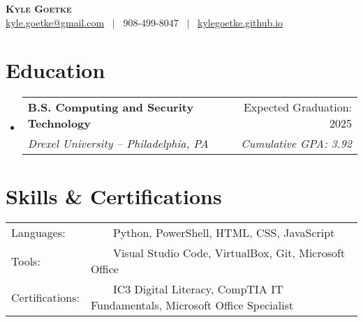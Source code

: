\documentclass[letterpaper,11pt]{article}
\makeatletter
\newcommand{\resumeSubheading}[4]{
	\vspace{-2pt}\item
		\begin{tabular*}{1\textwidth}[t]{l@{\extracolsep{\fill}}r}
			\textbf{#1} & #2 \\
			\textit{#3} & \textit{#4} \\
		\end{tabular*}\vspace{-7pt}
}
\newcommand{\resumeSubHeadingListStart}{\begin{itemize}[leftmargin=0in, label={}]}
\newcommand{\resumeSubHeadingListEnd}{\end{itemize}}
\makeatother
\begin{document}

\begin{center}
	\textbf{\LARGE \scshape Kyle Goetke} \\ \vspace{5pt}
	\large \href{mailto:kyle.goetke@gmail.com}{kyle.goetke@gmail.com}~ $|$ ~908-499-8047~ $|$ ~\href{https://kylegoetke.github.io}{kylegoetke.github.io}
\end{center}

\section{\textcolor{HeaderColor}{\textbf{\large Education}}}
\resumeSubHeadingListStart
\resumeSubheading
{B.S. Computing and Security Technology}{Expected Graduation: 2025}
{Drexel University -- Philadelphia, PA}{\normalfont Cumulative GPA: 3.92} \vspace{-2pt}
\resumeSubHeadingListEnd

\section{\textcolor{HeaderColor}{\textbf{\large Skills \& Certifications}}}

\begin{tabular}{l l}
	{ Languages: } & { ~~~~Python, PowerShell, HTML, CSS, JavaScript} \\
	{ Tools: } & { ~~~~Visual Studio Code, VirtualBox, Git, Microsoft Office} \\
	{ Certifications: } & { ~~~~IC3 Digital Literacy, CompTIA IT Fundamentals, Microsoft Office Specialist}
\end{tabular}

\end{document}

